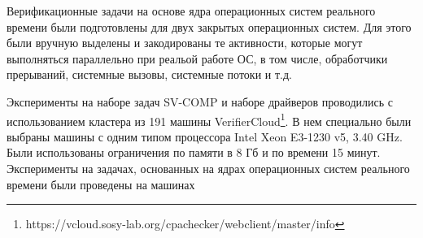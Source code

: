 Верификационные задачи на основе ядра операционных систем реального времени были подготовлены для двух закрытых операционных систем.
Для этого были вручную выделены и закодированы те активности, которые могут выполняться параллельно при реальой работе ОС, в том числе, обработчики прерываний, системные вызовы, системные потоки и т.д.

Эксперименты на наборе задач SV-COMP и наборе драйверов проводились с использованием кластера из 191 машины VerifierCloud\footnote{https://vcloud.sosy-lab.org/cpachecker/webclient/master/info}.
В нем специально были выбраны машины с одним типом процессора Intel Xeon E3-1230 v5, 3.40 GHz.
Были использованы ограничения по памяти в 8 Гб и по времени 15 минут.
Эксперименты на задачах, основанных на ядрах операционных систем реального времени были проведены на машинах 

